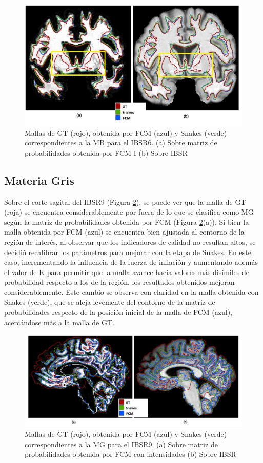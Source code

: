 \begin{figure}[H]
	\centering
	\includegraphics[scale=0.4]{images/MB_3.jpg}
	\caption{Mallas de GT (rojo), obtenida por FCM (azul) y Snakes (verde) correspondientes a la MB para el IBSR6. (a) Sobre matriz de probabilidades obtenida por FCM I (b) Sobre IBSR}
	\label{fig:cualitativa_mb_3}
\end{figure}

\subsection{Materia Gris}
Sobre el corte sagital del IBSR9 (Figura \ref{fig:cualitativa_mg}), se puede ver que la malla de GT (roja) se encuentra considerablemente por fuera de lo que se clasifica como MG según la matriz de probabilidades obtenida por FCM (Figura \ref{fig:cualitativa_mg}(a)). Si bien la malla obtenida por FCM (azul) se encuentra bien ajustada al contorno de la región de interés, al observar que los indicadores de calidad no resultan altos, se decidió recalibrar los parámetros para mejorar con la etapa de Snakes. En este caso, incrementando la influencia de la fuerza de inflación y aumentando además el valor de K para permitir que la malla avance hacia valores más disímiles de probabilidad respecto a los de la región, los resultados obtenidos mejoran considerablemente. Este cambio se observa con claridad en la malla obtenida con Snakes (verde), que se aleja levemente del contorno de la matriz de probabilidades respecto de la posición inicial de la malla de FCM (azul), acercándose más a la malla de GT. 

\begin{figure}[H]
	\centering
	\includegraphics[scale=0.08]{images/MG_1.jpg}
	\caption{Mallas de GT (rojo), obtenida por FCM (azul) y Snakes (verde) correspondientes a la MG para el IBSR9. (a) Sobre matriz de probabilidades obtenida por FCM con intensidades (b) Sobre IBSR}
	\label{fig:cualitativa_mg}
\end{figure}

